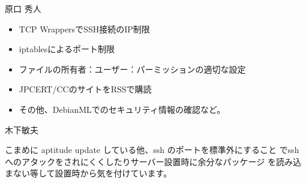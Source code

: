 \documentclass[mingoth,a4paper]{jsarticle}
\begin{document}
\begin{prework*}{ 原口 秀人 }
    
    \begin{itemize}
          \item TCP WrappersでSSH接続のIP制限
          \item iptablesによるポート制限
          \item ファイルの所有者：ユーザー：パーミッションの適切な設定
          \item JPCERT/CCのサイトをRSSで購読
          \item その他、DebianMLでのセキュリティ情報の確認など。
    \end{itemize}
    
\end{prework*}

\begin{prework*}{ 木下敏夫 }

    こまめに aptitude update している他、ssh のポートを標準外にすること
    でsshへのアタックをされにくくしたりサーバー設置時に余分なパッケージ
    を読み込まない等して設置時から気を付けています。
    
\end{prework*}
\end{document}
